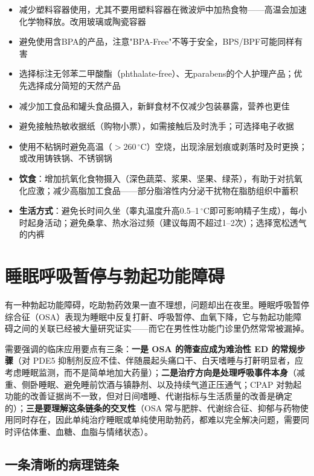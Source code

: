 \documentclass[12pt,a4paper,twoside]{ctexbook}
\begin{document}
\begin{itemize}[leftmargin=2cm]
	\item 减少塑料容器使用，尤其不要用塑料容器在微波炉中加热食物——高温会加速化学物释放。改用玻璃或陶瓷容器
	\item 避免使用含BPA的产品，注意"BPA-Free"不等于安全，BPS/BPF可能同样有害
	\item 选择标注无邻苯二甲酸酯（phthalate-free）、无parabens的个人护理产品；优先选择成分简短的天然产品
	\item 减少加工食品和罐头食品摄入，新鲜食材不仅减少包装暴露，营养也更佳
	\item 避免接触热敏收据纸（购物小票），如需接触后及时洗手；可选择电子收据
	\item 使用不粘锅时避免高温（$>260\,^\circ$C）空烧，出现涂层划痕或剥落时及时更换；或改用铸铁锅、不锈钢锅
	\item \textbf{饮食}：增加抗氧化食物摄入（深色蔬菜、浆果、坚果、绿茶），有助于对抗氧化应激；减少高脂加工食品——部分脂溶性内分泌干扰物在脂肪组织中蓄积
	\item \textbf{生活方式}：避免长时间久坐（睾丸温度升高0.5--1$\,^\circ$C即可影响精子生成），每小时起身活动；避免桑拿、热水浴过频（建议每周不超过1--2次）；选择宽松透气的内裤
\end{itemize}

\section{睡眠呼吸暂停与勃起功能障碍}


有一种勃起功能障碍，吃助勃药效果一直不理想，问题却出在夜里。睡眠呼吸暂停综合征（OSA）表现为睡眠中反复打鼾、呼吸暂停、血氧下降，它与勃起功能障碍之间的关联已经被大量研究证实——而它在男性性功能门诊里仍然常常被漏掉。


需要强调的临床应用要点有三条：\textbf{一是 OSA 的筛查应成为难治性 ED 的常规步骤}（对 PDE5 抑制剂反应不佳、伴随晨起头痛口干、白天嗜睡与打鼾明显者，应考虑睡眠监测，而不是简单地加大药量）；\textbf{二是治疗方向是处理呼吸事件本身}（减重、侧卧睡眠、避免睡前饮酒与镇静剂、以及持续气道正压通气；CPAP 对勃起功能的改善证据尚不一致，但对日间嗜睡、代谢指标与生活质量的改善是确定的）；\textbf{三是要理解这条链条的交叉性}（OSA 常与肥胖、代谢综合征、抑郁与药物使用同时存在，因此单纯治疗睡眠或单纯使用助勃药，都难以完全解决问题，需要同时评估体重、血糖、血脂与情绪状态）。

\subsection{一条清晰的病理链条}
\end{document}

